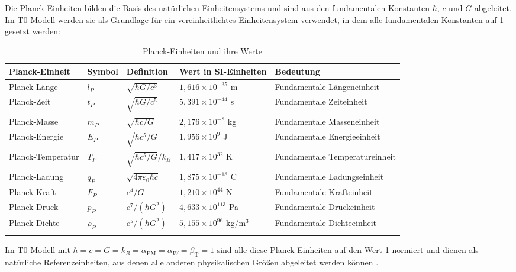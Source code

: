 \documentclass[12pt,a4paper]{article}
\newcommand{\alphaEM}{\alpha_{\text{EM}}}
\newcommand{\betaT}{\beta_{\text{T}}}
\begin{document}
	Die Planck-Einheiten bilden die Basis des natürlichen Einheitensystems und sind aus den fundamentalen Konstanten $\hbar$, $c$ und $G$ abgeleitet. Im T0-Modell werden sie als Grundlage für ein vereinheitlichtes Einheitensystem verwendet, in dem alle fundamentalen Konstanten auf 1 gesetzt werden:
	
	\begin{table}[ht]
		\centering
		\begin{adjustbox}{scale=0.75}
			\begin{tabular}{lllll}
				\hline
				\textbf{Planck-Einheit} & \textbf{Symbol} & \textbf{Definition} & \textbf{Wert in SI-Einheiten} & \textbf{Bedeutung} \\
				\hline
				Planck-Länge & $l_P$ & $\sqrt{\hbar G/c^3}$ & $1,616 \times 10^{-35}$ m & Fundamentale Längeneinheit \\
				Planck-Zeit & $t_P$ & $\sqrt{\hbar G/c^5}$ & $5,391 \times 10^{-44}$ s & Fundamentale Zeiteinheit \\
				Planck-Masse & $m_P$ & $\sqrt{\hbar c/G}$ & $2,176 \times 10^{-8}$ kg & Fundamentale Masseneinheit \\
				Planck-Energie & $E_P$ & $\sqrt{\hbar c^5/G}$ & $1,956 \times 10^9$ J & Fundamentale Energieeinheit \\
				Planck-Temperatur & $T_P$ & $\sqrt{\hbar c^5/G}/k_B$ & $1,417 \times 10^{32}$ K & Fundamentale Temperatureinheit \\
				Planck-Ladung & $q_P$ & $\sqrt{4\pi\varepsilon_0\hbar c}$ & $1,875 \times 10^{-18}$ C & Fundamentale Ladungseinheit \\
				Planck-Kraft & $F_P$ & $c^4/G$ & $1,210 \times 10^{44}$ N & Fundamentale Krafteinheit \\
				Planck-Druck & $p_P$ & $c^7/(\hbar G^2)$ & $4,633 \times 10^{113}$ Pa & Fundamentale Druckeinheit \\
				Planck-Dichte & $\rho_P$ & $c^5/(\hbar G^2)$ & $5,155 \times 10^{96}$ kg/m$^3$ & Fundamentale Dichteeinheit \\
				\hline
			\multicolumn{4}{c}{} \\
				\hline
			\end{tabular}
		\end{adjustbox}
		\caption{Planck-Einheiten und ihre Werte }
		\label{tab:planck_units}
	\end{table}
	
	Im T0-Modell mit $\hbar = c = G = k_B = \alphaEM = \alpha_W = \betaT = 1$ sind alle diese Planck-Einheiten auf den Wert 1 normiert und dienen als natürliche Referenzeinheiten, aus denen alle anderen physikalischen Größen abgeleitet werden können \cite{pascher_planck_2025}.
	
\end{document}
